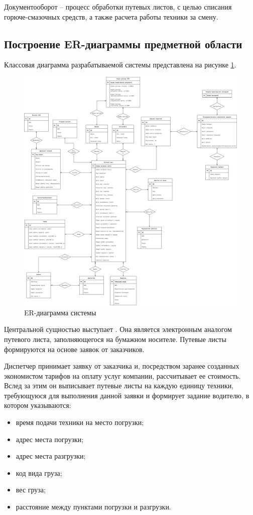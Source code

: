 \documentclass[../nirs.tex]{subfiles}
\begin{document}
Документооборот -- процесс обработки путевых листов, с целью списания
горюче-смазочных средств, а также расчета работы техники за смену.

\subsection{Построение ER-диаграммы предметной области}
Классовая диаграмма разрабатываемой системы представлена на рисунке
\ref{fig:2_1_3_er_diagram}.

\begin{figure}[hp!]
	\centering
	\includegraphics[keepaspectratio,width=\textwidth]{./images/2_1_3_er-diagram.png}
	\caption{ER-диаграмма системы}
	\label{fig:2_1_3_er_diagram}
\end{figure}

Центральной сущностью выступает . Она является
электронным аналогом путевого листа, заполняющегося на бумажном носителе.
Путевые листы формируются на основе заявок от заказчиков.

Диспетчер принимает заявку от заказчика и, посредством заранее созданных
экономистом тарифов на оплату услуг компании, рассчитывает ее стоимость. Вслед
за этим он выписывает путевые листы на каждую единицу техники, требующуюся для
выполнения данной заявки и формирует задание водителю, в котором указываются:
\begin{itemize}
	\item время подачи техники на место погрузки;
	\item адрес места погрузки;
	\item адрес места разгрузки;
	\item код вида груза;
	\item вес груза;
	\item расстояние между пунктами погрузки и разгрузки.
\end{itemize}
\end{document}
